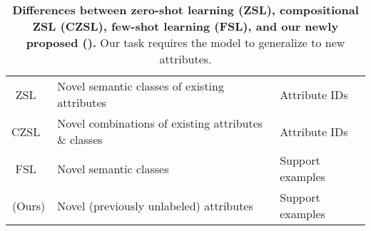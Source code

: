 \begin{table*}
\begin{center}
\begin{small}
{\begin{tabular}{cll}
    \hline                       
    ZSL~\citep{attributezsl}      & Novel semantic classes of existing attributes        & Attribute IDs         \\
    CZSL~\citep{czsl}             & Novel combinations of existing attributes \& classes & Attribute IDs \\
    FSL~\citep{lake2011oneshot}   & Novel semantic classes                        & Support examples           \\   
    \midrule
    \taskname{} (Ours)             & Novel (previously unlabeled) attributes      & Support examples           \\
    \bottomrule
    \end{tabular}
    }
    \fi
    \end{small}
    \end{center}
    \savespacebeforesection
\fi
\caption{\textbf{Differences between  zero-shot learning (ZSL), compositional ZSL (CZSL), few-shot
learning (FSL), and our newly proposed \titlelower{} (\taskname{}).} Our task requires the model to
generalize to new attributes.}
\label{tab:benchmarkdiff}
\savespacebeforesection
\end{table*}
